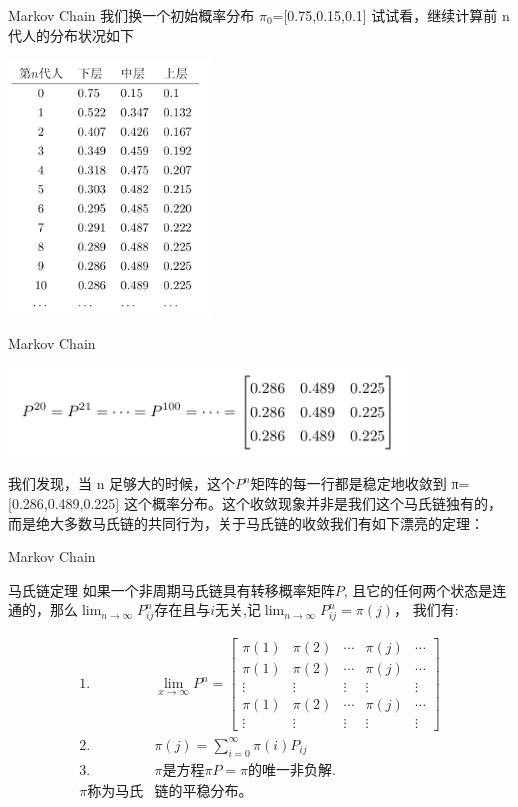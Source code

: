 \documentclass{beamer}
\begin{document}
\begin{CJK*}{UTF8}{gbsn}
\begin{frame}{Markov Chain}
我们换一个初始概率分布 $\pi_0$=[0.75,0.15,0.1] 试试看，继续计算前 n 代人的分布状况如下\begin{center}
      \includegraphics[width=0.4\textwidth]{picture/MC4.png}
   	 \end{center}
\end{frame}


\begin{frame}{Markov Chain}
\begin{center}
      \includegraphics[width=0.8\textwidth]{picture/MC5.png}
   	 \end{center}我们发现，当 n 足够大的时候，这个$P^n$矩阵的每一行都是稳定地收敛到 π=[0.286,0.489,0.225] 这个概率分布。这个收敛现象并非是我们这个马氏链独有的，而是绝大多数马氏链的共同行为，关于马氏链的收敛我们有如下漂亮的定理：
\end{frame}


\begin{frame}{Markov Chain}
\begin{block}{马氏链定理}
   如果一个非周期马氏链具有转移概率矩阵$P$, 且它的任何两个状态是连通的，那么$\lim_{n\to\infty}P_{ij}^n$存在且与$i$无关,记$\lim_{n\to\infty}P_{ij}^n=\pi (j)$， 我们有:
 \begin{small}
 \begin{align*}
 1.\quad &\lim_{x\to\infty}P^n=
    \begin{bmatrix}
		\pi(1)&\pi(2)&\cdots&\pi(j)&\cdots\\
		\pi(1)&\pi(2)&\cdots&\pi(j)&\cdots\\
		\vdots&\vdots&\vdots&\vdots&\vdots\\
		\pi(1)&\pi(2)&\cdots&\pi(j)&\cdots\\
		\vdots&\vdots&\vdots&\vdots&\vdots
\end{bmatrix}\\
2.\quad &\pi(j)=\sum_{i=0}^\infty\pi(i)P_{ij}\\
3.\quad &\pi\text{是方程}\pi P=\pi\text{的唯一非负解.}\\ 
\pi\text{称为马氏}&\text{链的平稳分布。}
 \end{align*}
 \end{small}
\end{block}
\end{frame}



\end{CJK*}
\end{document}
